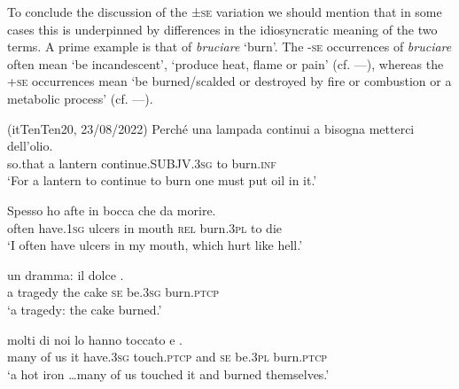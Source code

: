 \documentclass[output=paper,colorlinks,citecolor=brown
]{langscibook}
\begin{document}
To conclude the discussion of the ±\textsc{se} variation we should mention that in some cases this is underpinned by differences in the idiosyncratic meaning of the two terms. A prime example is that of \textit{bruciare} ‘burn’. The -\textsc{se} occurrences of \textit{bruciare} often mean ‘be incandescent’, ‘produce heat, flame or pain’ (cf. —), whereas the +\textsc{se} occurrences mean ‘be burned/scalded or destroyed by fire or combustion or a metabolic process’ (cf. —).

\hspace*{\fill}(itTenTen20, 23/08/2022)\quad
\ea \label{bentley_example_35}
    \gll Perché		una	lampada	continui											a 	 {bisogna metterci dell’olio.} \\
    	so.that		a				lantern			continue.SUBJV.3\textsc{sg}	to	burn.\textsc{inf} {} \\
    \glt 				‘For a lantern to continue to burn one must put oil in it.’
\z

\ea \label{bentley_example_36}
    \gll Spesso		ho						afte			in	bocca		che			da	morire. \\
    	often			have.1\textsc{sg}	ulcers	in	mouth	\textsc{rel}	burn.3\textsc{pl}		to		die \\
    \glt 				‘I often have ulcers in my mouth, which hurt like hell.’
\z

\ea \label{bentley_example_37}
    \gll  {\ldots}  un dramma: il		dolce  					. \\
    	{} a			tragedy		the	cake		\textsc{se}		be.3\textsc{sg}	burn.\textsc{ptcp} \\
    \glt 	‘a tragedy: the cake burned.’
\z

\ea \label{bentley_example_38}
     molti di		noi	lo	hanno			toccato				e								. \\
    	{} many	of		us		it	have.3\textsc{sg}	touch.\textsc{ptcp}		and	\textsc{se}	be.3\textsc{pl}		burn.\textsc{ptcp} \\
    \glt ‘a hot iron  \ldots  many of us touched it and burned themselves.’	
\z
\end{document}
